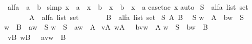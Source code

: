 %
\begin{isabellebody}%
\def\isabellecontext{AB}%
%
\ alfa\ {\isacharequal}\ a\ {\isacharbar}\ b\isanewline
\isanewline
{}\ {\isacharbrackleft}simp{\isacharbrackright}{\isacharcolon}\ {\isachardoublequote}{\isacharparenleft}x\ {\isachartilde}{\isacharequal}\ a{\isacharparenright}\ {\isacharequal}\ {\isacharparenleft}x\ {\isacharequal}\ b{\isacharparenright}\ {\isacharampersand}\ {\isacharparenleft}x\ {\isachartilde}{\isacharequal}\ b{\isacharparenright}\ {\isacharequal}\ {\isacharparenleft}x\ {\isacharequal}\ a{\isacharparenright}{\isachardoublequote}\isanewline
{}case{\isacharunderscore}tac\ x{\isacharparenright}\isanewline
{}auto{\isacharparenright}\isanewline
\isanewline
{}\ S\ {\isacharcolon}{\isacharcolon}\ {\isachardoublequote}alfa\ list\ set{\isachardoublequote}\isanewline
\ \ \ \ \ \ \ A\ {\isacharcolon}{\isacharcolon}\ {\isachardoublequote}alfa\ list\ set{\isachardoublequote}\isanewline
\ \ \ \ \ \ \ B\ {\isacharcolon}{\isacharcolon}\ {\isachardoublequote}alfa\ list\ set{\isachardoublequote}\isanewline
\isanewline
{}\ S\ A\ B\isanewline
{}\isanewline
{\isachardoublequote}{\isacharbrackleft}{\isacharbrackright}\ {\isacharcolon}\ S{\isachardoublequote}\isanewline
{\isachardoublequote}w\ {\isacharcolon}\ A\ {\isacharequal}{\isacharequal}{\isachargreater}\ b{\isacharhash}w\ {\isacharcolon}\ S{\isachardoublequote}\isanewline
{\isachardoublequote}w\ {\isacharcolon}\ B\ {\isacharequal}{\isacharequal}{\isachargreater}\ a{\isacharhash}w\ {\isacharcolon}\ S{\isachardoublequote}\isanewline
\isanewline
{\isachardoublequote}w\ {\isacharcolon}\ S\ {\isacharequal}{\isacharequal}{\isachargreater}\ a{\isacharhash}w\ {\isacharcolon}\ A{\isachardoublequote}\isanewline
{\isachardoublequote}{\isacharbrackleft}{\isacharbar}\ v{\isacharcolon}A{\isacharsemicolon}\ w{\isacharcolon}A\ {\isacharbar}{\isacharbrackright}\ {\isacharequal}{\isacharequal}{\isachargreater}\ b{\isacharhash}v{\isacharat}w\ {\isacharcolon}\ A{\isachardoublequote}\isanewline
\isanewline
{\isachardoublequote}w\ {\isacharcolon}\ S\ {\isacharequal}{\isacharequal}{\isachargreater}\ b{\isacharhash}w\ {\isacharcolon}\ B{\isachardoublequote}\isanewline
{\isachardoublequote}{\isacharbrackleft}{\isacharbar}\ v{\isacharcolon}B{\isacharsemicolon}\ w{\isacharcolon}B\ {\isacharbar}{\isacharbrackright}\ {\isacharequal}{\isacharequal}{\isachargreater}\ a{\isacharhash}v{\isacharat}w\ {\isacharcolon}\ B{\isachardoublequote}\isanewline

\end{isabellebody}
